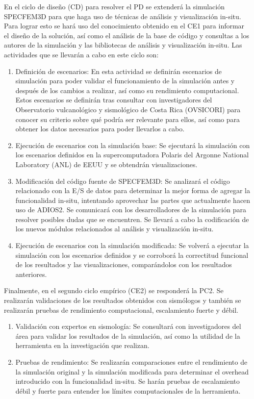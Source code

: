 En el ciclo de diseño (CD) para resolver el PD se extenderá la simulación SPECFEM3D para que haga uso de técnicas de análisis y visualización in-situ. Para lograr esto se hará uso del conocimiento obtenido en el CE1 para informar el diseño de la solución, así como el análisis de la base de código y consultas a los autores de la simulación y las bibliotecas de análisis y visualización in-situ.
Las actividades que se llevarán a cabo en este ciclo son:
\begin{enumerate}
    \setcounter{enumi}{\value{tasks}}
    \item Definición de escenarios: En esta actividad se definirán escenarios de simulación para poder validar el funcionamiento de la simulación antes y después de los cambios a realizar, así como su rendimiento computacional. Estos escenarios se definirán tras consultar con investigadores del Observatorio vulcanológico y sismológico de Costa Rica (OVSICORI) para conocer su criterio sobre qué podría ser relevante para ellos, así como para obtener los datos necesarios para poder llevarlos a cabo.
    \item Ejecución de escenarios con la simulación base: Se ejecutará la simulación con los escenarios definidos en la supercomputadora Polaris del Argonne National Laboratory (ANL) de EEUU y se obtendrán visualizaciones.
    \item Modificación del código fuente de SPECFEM3D: Se analizará el código relacionado con la E/S de datos para determinar la mejor forma de agregar la funcionalidad in-situ, intentando aprovechar las partes que actualmente hacen uso de ADIOS2. Se comunicará con los desarrolladores de la simulación para resolver posibles dudas que se encuentren. Se llevará a cabo la codificación de los nuevos módulos relacionados al análisis y visualización in-situ.
    \item Ejecución de escenarios con la simulación modificada: Se volverá a ejecutar la simulación con los escenarios definidos y se corroborá la correctitud funcional de los resultados y las visualizaciones, comparándolos con los resultados anteriores. 
    \setcounter{tasks}{\value{enumi}}
\end{enumerate}

Finalmente, en el segundo ciclo empírico (CE2) se responderá la PC2. Se realizarán validaciones de los resultados obtenidos con sismólogos y también se realizarán pruebas de rendimiento computacional, escalamiento fuerte y débil.

\begin{enumerate}
    \setcounter{enumi}{\value{tasks}}
    \item Validación con expertos en sismología: Se consultará con investigadores del área para validar los resultados de la simulación, así como la utilidad de la herramienta en la investigación que realizan.
    \item Pruebas de rendimiento: Se realizarán comparaciones entre el rendimiento de la simulación original y la simulación modificada para determinar el overhead introducido con la funcionalidad in-situ. Se harán pruebas de escalamiento débil y fuerte para entender los límites computacionales de la herramienta.
\end{enumerate}


